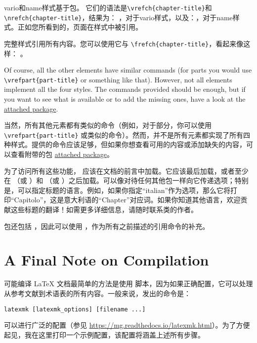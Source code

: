 vario和name样式基于包。
它们的语法是\lstinline|\vrefch{chapter-title}|和
\lstinline|\nrefch{chapter-title}|，结果为：
，对于vario样式，以及：，对于name样式。正如您所看到的，页面在样式中被引用。

完整样式引用所有内容。您可以使用它与
\lstinline|\frefch{chapter-title}|，看起来像这样：
。

Of course, all the other elements have similar commands (\eg for parts 
you would use \lstinline|\vrefpart{part-title}| or something like that). 
However, not all elements implement all the four styles. The commands 
provided should be enough, but if you want to see what is available or 
to add the missing ones, have a look at the 
\href{styles/kaorefs.sty}{attached package}. 

当然，所有其他元素都有类似的命令（例如，对于部分，你可以使用 \lstinline|\vrefpart{part-title}| 或类似的命令）。然而，并不是所有元素都实现了所有四种样式。提供的命令应该足够，但如果你想查看可用的内容或添加缺失的内容，可以查看附带的包 \href{styles/kaorefs.sty}{attached package}。

为了访问所有这些功能， 应该在文档的前言中加载。它应该最后加载，或者至少在 （或 ）和 （或 ）之后加载。可以像对待任何其他包一样向它传递选项；特别是，可以指定标题的语言。例如，如果你指定\enquote{italian}作为选项，那么它将打印\enquote{Capitolo}，这是意大利语的\enquote{Chapter}对应词。如果你知道其他语言，欢迎贡献这些标题的翻译！如需更多详细信息，请随时联系类的作者。

 包还包括 ，因此可以使用 ，作为所有之前描述的引用命令的补充。

\section{A Final Note on Compilation}

可能编译 LaTeX 文档最简单的方法是使用  脚本，因为如果正确配置，它可以处理从参考文献到术语表的所有内容。一般来说，发出的命令是：

\begin{lstlisting}
latexmk [latexmk_options] [filename ...]
\end{lstlisting}

 可以进行广泛的配置（参见 \url{https://mg.readthedocs.io/latexmk.html}）。为了方便起见，我在这里打印一个示例配置，该配置将涵盖上述所有步骤。

